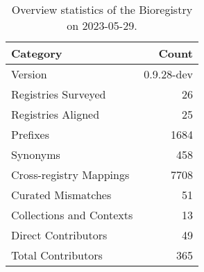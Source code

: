 \begin{table}
\caption{Overview statistics of the Bioregistry on 2023-05-29.}
\label{tab:bioregistry-summary}
\begin{tabular}{lr}
\toprule
Category & Count \\
\midrule
Version & 0.9.28-dev \\
Registries Surveyed & 26 \\
Registries Aligned & 25 \\
Prefixes & 1684 \\
Synonyms & 458 \\
Cross-registry Mappings & 7708 \\
Curated Mismatches & 51 \\
Collections and Contexts & 13 \\
Direct Contributors & 49 \\
Total Contributors & 365 \\
\bottomrule
\end{tabular}
\end{table}
